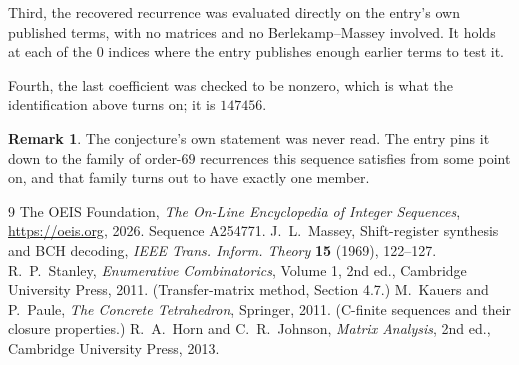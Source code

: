 \documentclass[11pt,a4paper]{article}
\theoremstyle{plain}
\theoremstyle{definition}
\newtheorem{remark}[theorem]{Remark}
\begin{document}
Third, the recovered recurrence was evaluated directly on the entry's own published terms, with
no matrices and no Berlekamp--Massey involved. It holds at each of the $0$ indices where
the entry publishes enough earlier terms to test it.

Fourth, the last coefficient was checked to be nonzero, which is what the identification above
turns on; it is $147456$.

\begin{remark}
The conjecture's own statement was never read. The entry pins it down to the family of
order-$69$ recurrences this sequence satisfies from some point on, and that family turns
out to have exactly one member.
\end{remark}

\begin{thebibliography}{9}
 The OEIS Foundation, \emph{The On-Line Encyclopedia of Integer
Sequences}, \url{https://oeis.org}, 2026. Sequence A254771.
 J.~L.~Massey, Shift-register synthesis and BCH decoding, \emph{IEEE
Trans. Inform. Theory} \textbf{15} (1969), 122--127.
 R.~P.~Stanley, \emph{Enumerative Combinatorics}, Volume 1, 2nd ed.,
Cambridge University Press, 2011. (Transfer-matrix method, Section 4.7.)
 M.~Kauers and P.~Paule, \emph{The Concrete Tetrahedron}, Springer, 2011.
(C-finite sequences and their closure properties.)
 R.~A.~Horn and C.~R.~Johnson, \emph{Matrix Analysis}, 2nd ed., Cambridge
University Press, 2013.
\end{thebibliography}
\end{document}
